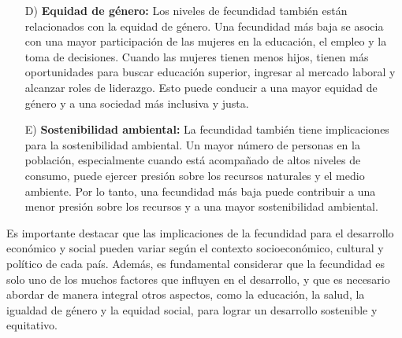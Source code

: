 \documentclass[8pt,a4paper]{beamer}
\begin{document}
{\begin{frame}{}
\begin{block}{}
\begin{enumerate}
\item[D)] \textbf{Equidad de género:} Los niveles de fecundidad también están relacionados con la equidad de género. Una fecundidad más baja se asocia con una mayor participación de las mujeres en la educación, el empleo y la toma de decisiones. Cuando las mujeres tienen menos hijos, tienen más oportunidades para buscar educación superior, ingresar al mercado laboral y alcanzar roles de liderazgo. Esto puede conducir a una mayor equidad de género y a una sociedad más inclusiva y justa.
\end{enumerate}
\end{block}
\end{frame}


\begin{frame}{}
\begin{block}{}
\setlength{\parskip}{3px}
\justifying
\begin{enumerate}
\setlength{\parskip}{3px}
\justifying
\item[E)] \textbf{Sostenibilidad ambiental:} La fecundidad también tiene implicaciones para la sostenibilidad ambiental. Un mayor número de personas en la población, especialmente cuando está acompañado de altos niveles de consumo, puede ejercer presión sobre los recursos naturales y el medio ambiente. Por lo tanto, una fecundidad más baja puede contribuir a una menor presión sobre los recursos y a una mayor sostenibilidad ambiental.
\end{enumerate}
Es importante destacar que las implicaciones de la fecundidad para el desarrollo económico y social pueden variar según el contexto socioeconómico, cultural y político de cada país. Además, es fundamental considerar que la fecundidad es solo uno de los muchos factores que influyen en el desarrollo, y que es necesario abordar de manera integral otros aspectos, como la educación, la salud, la igualdad de género y la equidad social, para lograr un desarrollo sostenible y equitativo.
\end{block}
\end{frame}

}
\end{document}
